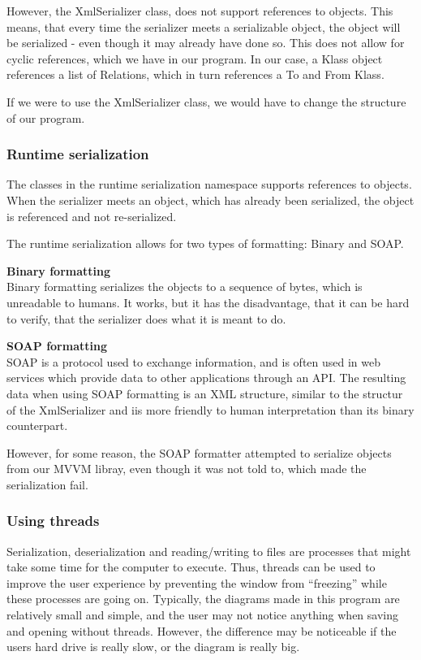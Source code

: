 However, the XmlSerializer class, does not support references to objects. This means, that every time the serializer meets a serializable object, the object will be serialized - even though it may already have done so. This does not allow for cyclic references, which we have in our program. In our case, a Klass object references a list of Relations, which in turn references a To and From Klass.

If we were to use the XmlSerializer class, we would have to change the structure of our program.

\subsubsection{Runtime serialization}
The classes in the runtime serialization namespace supports references to objects. When the serializer meets an object, which has already been serialized, the object is referenced and not re-serialized.


The runtime serialization allows for two types of formatting: Binary and SOAP.

\textbf{Binary formatting}\\
Binary formatting serializes the objects to a sequence of bytes, which is unreadable to humans. It works, but it has the disadvantage, that it can be hard to verify, that the serializer does what it is meant to do.

\textbf{SOAP formatting}\\
SOAP is a protocol used to exchange information, and is often used in web services which provide data to other applications through an API. The resulting data when using SOAP formatting is an XML structure, similar to the structur of the XmlSerializer and iis more friendly to human interpretation than its binary counterpart.

However, for some reason, the SOAP formatter attempted to serialize objects from our MVVM libray, even though it was not told to, which made the serialization fail.

\subsubsection{Using threads}
Serialization, deserialization and reading/writing to files are processes that might take some time for the computer to execute. Thus, threads can be used to improve the user experience by preventing the window from “freezing” while these processes are going on. Typically, the diagrams made in this program are relatively small and simple, and the user may not notice anything when saving and opening without threads. However, the difference may be noticeable if the users hard drive is really slow, or the diagram is really big.

